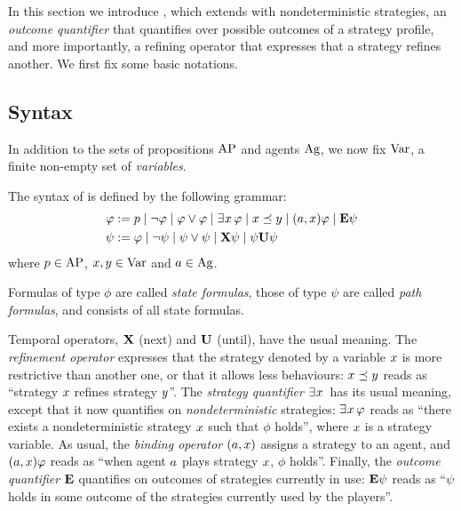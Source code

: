 
In this section we introduce \SLref, which extends \SL 
with nondeterministic strategies,  an \emph{outcome quantifier} that
quantifies over possible outcomes of a strategy profile,
and more importantly, a refining operator that expresses that a
strategy refines another.
We first fix some basic notations.



 \subsection{Syntax}
 \label{sec-SL-definition}

In addition to the sets of propositions $\textnormal{AP}$ and agents $\textnormal{Ag}$, we
now fix $\textnormal{Var}$, a finite non-empty set of \emph{variables}.



\begin{definition}%
  \label{def-SLi}
    The syntax of \SLref is defined by the following grammar:
    \begin{align*}
  \varphi:= &\; p 
  \mid \neg \varphi 
  \mid \varphi\vee\varphi 
               \mid \exists^{} x\,\varphi
               \mid x \preceq y
               \mid (a,x)\varphi
  \mid {\bf E}\psi               
      \\
      \psi:= &\; \varphi
                   \mid \neg \psi
                   \mid \psi\vee \psi
                   \mid {\bf X} \psi
                   \mid  \psi {\bf U} \psi
    \end{align*}
     where 
  $p\in\textnormal{AP}$, $x,y\in\textnormal{Var}$ and $a\in\textnormal{Ag}$.
\end{definition}

Formulas of type $\phi$ are called \emph{state formulas}, those of type $\psi$
are called \emph{path formulas}, and \SLref consists of all state formulas.


Temporal operators, ${\bf X}$ (next) and
 ${\bf U}$ (until), have the usual meaning. The \emph{refinement
   operator} expresses that the strategy denoted by a variable $x$ is more
 restrictive than another one, or that it allows less behaviours: $x\preceq y$ reads as ``strategy
 $x$ refines strategy $y$''. The  \emph{strategy
   quantifier}  $\exists^{} x\,$  has its usual meaning, except that it now
 quantifies on \emph{nondeterministic}
 strategies: $\exists^{} x\,\varphi$
 reads as ``there exists a nondeterministic
 strategy $x$
  such that $\phi$
 holds'', where $x$ is a strategy variable. 
As usual, the \emph{binding operator} $(a,x)$ assigns a strategy to an
 agent, and $(a,x)\varphi$ reads as ``when agent $a$ plays strategy $x$,
 $\phi$ holds''.
Finally, the \emph{outcome quantifier} ${\bf E}$ quantifies on
   outcomes of strategies currently in use: ${\bf E}\psi$ reads as ``$\psi$
 holds in some
 outcome of the strategies currently used by the players''.

